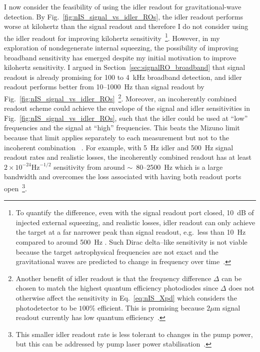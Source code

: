 I now consider the feasibility of using the idler readout for gravitational-wave detection. By Fig.~\ref{fig:nIS_signal_vs_idler_ROs}, the idler readout performs worse at kilohertz than the signal readout  and therefore I do not consider using the idler readout for improving kilohertz sensitivity~\footnote{To quantify the difference, even with the signal readout port closed, 10~dB of injected external squeezing, and realistic losses, idler readout can only achieve the target at a far narrower peak than signal readout, e.g.\ less than 10~Hz compared to around 500~Hz . Such Dirac delta--like sensitivity is not viable because the target astrophysical frequencies are not exact and the gravitational waves are predicted to change in frequency over time~\cite{}.}.
However, in my exploration of nondegenerate internal squeezing, the possibility of improving broadband sensitivity has emerged despite my initial motivation to improve kilohertz sensitivity. I argued in Section~\ref{sec:signalRO_broadband} that signal readout is already promising for 100 to 4~kHz broadband detection, and idler readout performs better from 10--1000~Hz than signal readout by Fig.~\ref{fig:nIS_signal_vs_idler_ROs}~\footnote{Another benefit of idler readout is that the frequency difference $\Delta$ can be chosen to match the highest quantum efficiency photodiodes since $\Delta$ does not otherwise affect the sensitivity in Eq.~\ref{eq:nIS_Xpd} which considers the photodetector to be $100\%$ efficient. This is promising because $2 \mu\text{m}$ signal readout currently has low quantum efficiency~\cite{}. }. %
Moreover, an incoherently combined readout scheme could achieve the envelope of the signal and idler sensitivities in Fig.~\ref{fig:nIS_signal_vs_idler_ROs}, such that the idler could be used at ``low'' frequencies and the signal at ``high'' frequencies. This beats the Mizuno limit because that limit applies separately to each measurement but not to the incoherent combination ~\cite{}.
For example, with 5~Hz idler and 500~Hz signal readout rates and realistic losses, the incoherently combined readout has at least $2\times10^{-24}\text{Hz}^{-1/2}$ sensitivity from around $\sim$~80--2500~Hz  which is a large bandwidth  and overcomes the loss associated with having both readout ports open~\footnote{This smaller idler readout rate is less tolerant to changes in the pump power, but this can be addressed by pump laser power stabilisation~\cite{}.}.
